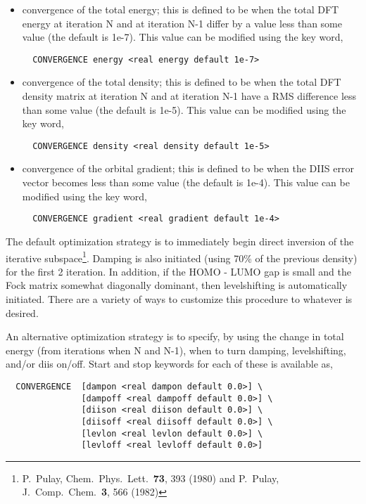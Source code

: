 \begin{itemize}
\item convergence of the total energy; this is defined to be when the
  total DFT energy at iteration N and at iteration N-1 differ by a value less
  than some value (the default is 1e-7).  This value can be modified
  using the key word,

\begin{verbatim}
  CONVERGENCE energy <real energy default 1e-7>
\end{verbatim}

\item convergence of the total density; this is defined to be when the
  total DFT density matrix at iteration N and at iteration N-1 have a
  RMS difference less than some value (the default is 1e-5).  This value can be modified
  using the key word,

\begin{verbatim}
  CONVERGENCE density <real density default 1e-5>
\end{verbatim}

\item convergence of the orbital gradient; this is defined to be when the
  DIIS error vector becomes less than some value (the default is
  1e-4).  This value can be modified using the key word,

\begin{verbatim}
  CONVERGENCE gradient <real gradient default 1e-4>
\end{verbatim}
\end{itemize}

The default optimization strategy is to immediately begin direct inversion of the
iterative subspace\footnote {P.~Pulay,  Chem.\ Phys.\ Lett.\ {\bf 73}, 
393 (1980) and P.~Pulay,  J.~Comp.~Chem.~{\bf 3}, 566 (1982)}.
Damping is also initiated (using 70\% of the previous density) for
the first 2 iteration.  In addition, if the HOMO - LUMO gap is small
and the Fock matrix somewhat diagonally dominant, then levelshifting
is automatically initiated.  There are a variety of ways to customize
this procedure to whatever is desired.

An alternative optimization strategy is to specify, by using the change 
in total energy (from iterations when N and N-1), when to turn
damping, levelshifting, and/or diis on/off.  Start and stop keywords for
each of these is available as,

\begin{verbatim}
  CONVERGENCE  [dampon <real dampon default 0.0>] \
               [dampoff <real dampoff default 0.0>] \
               [diison <real diison default 0.0>] \
               [diisoff <real diisoff default 0.0>] \
               [levlon <real levlon default 0.0>] \
               [levloff <real levloff default 0.0>]
\end{verbatim}

